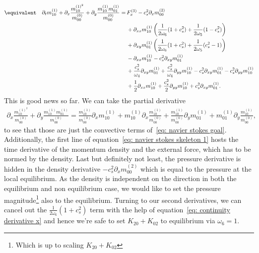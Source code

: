   \begin{align}
    \nonumber
    \equivalent\quad
  \partial_t m_{10}^{(1)}
  + \partial_x \frac{ m_{10}^{{(1)}^2} }{m_{00}^{(0)}}
  + \partial_y \frac{ m_{10}^{(1)}m_{01}^{(1)}}{m_{00}^{(0)}}
  =&\,
  F_x^{(3)}
  - c_s^2 \partial_x  m_{00}^{(2)}
  \\\nonumber &\,
  + \partial_{xx} m_{10}^{(1)} \left(\frac{1}{2\omega_6}(1+c_s^2)
  + \frac{1}{2\omega_5} (1 - c_s^2)\right)
  \\\nonumber &\,
  + \partial_{xy} m_{01}^{(1)} \left(\frac{1}{2\omega_6}(1+c_s^2)
  + \frac{1}{2\omega_5} (c_s^2 - 1)\right)
  \\\nonumber &\,
  - \partial_{xx} m_{10}^{(1)}
  - c_s^2\partial_{xy} m_{01}^{(1)}
  \\\nonumber &\,
  + \frac{c_s^2}{\omega_4}\partial_{xy} m_{01}^{(1)}
  + \frac{c_s^2}{\omega_4}\partial_{yy} m_{10}^{(1)}
  - c_s^2 \partial_{xy} m_{01}^{(1)}
  - c_s^2 \partial_{yy} m_{10}^{(1)}
  \\ &\,
  + \frac{1}{2}\partial_{xx} m_{10}^{(1)}
  + \frac{c_s^2}{2} \partial_{yy} m_{10}^{(1)} + c_s^2\partial_{xy} m_{01}^{(1)}
  .\label{eq: navier stokes skeleton 1}
\end{align}
This is good news so far.
We can take the partial derivative
\begin{align}
  \label{eq: convective parts}
  \partial_x \frac{ m_{10}^{{(1)}^2} }{m_{00}^{(0)}}
  + \partial_y \frac{ m_{10}^{(1)}m_{01}^{(1)}}{m_{00}^{(0)}}
  =
  \frac{ m_{10}^{{(1)}} }{m_{00}^{(0)}} \partial_x  m_{10}^{{(1)}}
  +  m_{10}^{{(1)}} \partial_x \frac{ m_{10}^{{(1)}} }{m_{00}^{(0)}}
  + \frac{ m_{10}^{(1)}}{m_{00}^{(0)}}\partial_y m_{01}^{(1)}
  + m_{01}^{(1)}\partial_y \frac{ m_{10}^{(1)}}{m_{00}^{(0)}},
\end{align}
to see that those are just the convective terms of~\eqref{eq: navier stokes goal}.
Additionally, the first line of equation~\eqref{eq: navier stokes skeleton 1} hosts the time derivative of the momentum density and the external force, which has to be normed by the density.
Last but definitely not least, the pressure derivative is hidden in the density derivative $-c_s^2 \partial_x  m_{00}^{(2)}$ which is equal to the pressure at the local equilibrium.
As the density is independent on the direction in both the equilibrium and non equilibrium case, we would like to set the pressure magnitude\footnote{Which is up to scaling $K_{20} + K_{02}$} also to the equilibrium.
Turning to our second derivatives, we can cancel out the $\frac{1}{2\omega_6}(1+c_s^2)$ term with the help of equation~\eqref{eq: continuity derivative x} and hence we're safe to set $K_{20} + K_{02}$ to equilibrium via $\omega_6=1$.


